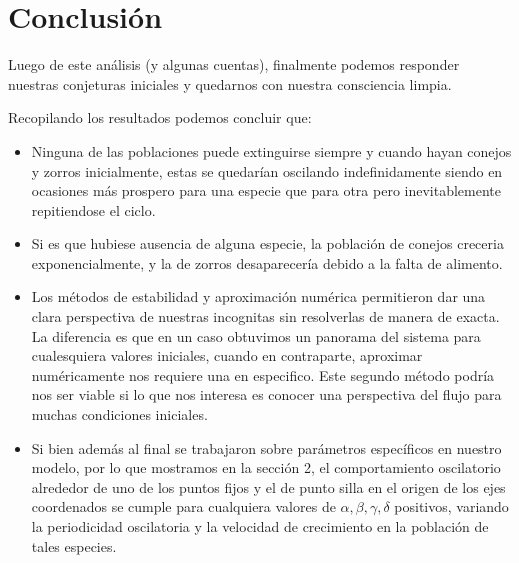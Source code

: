 \documentclass[10pt,journal,compsoc]{IEEEtran}
\begin{document}




\section{Conclusión}
 Luego de este análisis (y algunas cuentas), finalmente podemos responder
 nuestras conjeturas iniciales y quedarnos con nuestra consciencia limpia.

 Recopilando los resultados podemos concluir que:
 \begin{itemize}
   \item Ninguna de las poblaciones puede extinguirse siempre y cuando hayan
 conejos y zorros inicialmente, estas se quedarían oscilando indefinidamente
 siendo en ocasiones más prospero para una especie que para otra pero
 inevitablemente repitiendose el ciclo. 
   \item Si es que hubiese ausencia de alguna especie, la población de conejos
   creceria exponencialmente, y la de zorros desaparecería debido a la falta de
   alimento.
   \item Los métodos de estabilidad y aproximación numérica permitieron dar una
   clara perspectiva de nuestras incognitas sin resolverlas de manera de exacta.
   La diferencia es que en un caso obtuvimos un panorama del sistema para
   cualesquiera valores iniciales, cuando en contraparte, aproximar numéricamente
   nos requiere una en especifico. Este segundo método podría nos ser viable si
   lo que nos interesa es conocer una perspectiva del flujo para muchas
   condiciones iniciales.
   \item Si bien además al final se trabajaron sobre parámetros específicos en
   nuestro modelo, por lo que mostramos en la sección 2, el comportamiento
   oscilatorio alrededor de uno de los puntos fijos y el de punto silla en el
   origen de los ejes coordenados se cumple para cualquiera valores de
   $\alpha,\beta,\gamma,\delta$ positivos, variando la periodicidad oscilatoria
   y la velocidad de crecimiento en la población de tales especies.
 \end{itemize}
 
\end{document}
